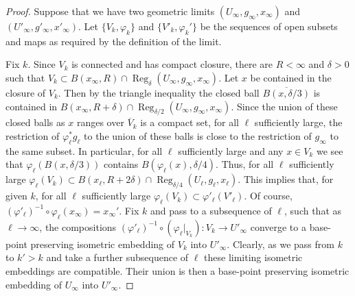 \begin{proof}
\sketch
{}
Suppose that we have two geometric limits
$(U_\infty,g_\infty,x_\infty)$ and
$(U'_\infty,g'_\infty,x'_\infty)$. Let $\{V_k,\varphi_k\}$ and
$\{V'_k,\varphi_k'\}$ be the sequences of open subsets and maps as
required by the definition of the limit.

Fix $k$. Since $V_k$ is connected and has compact closure, there are
$R<\infty$ and $\delta>0$ such that $V_k\subset B(x_\infty,R)\cap
\operatorname{Reg}_\delta(U_\infty,g_\infty,x_\infty)$. Let $x$ be contained
in the closure of $V_k$. Then by the triangle inequality the closed
ball $\overline{B(x,\delta/3)}$ is contained in
$B(x_\infty,R+\delta)\cap\operatorname{Reg}_{\delta/2}(U_\infty,g_\infty,x_\infty)$. Since the union of
these closed balls as $x$ ranges over $\overline V_k$ is a compact
set, for all $\ell$ sufficiently large, the restriction of
$\varphi_\ell^*g_\ell$ to the union of these balls is close to the
restriction of $g_\infty$ to the same subset. In particular, for all
$\ell$ sufficiently large and any $x\in V_k$ we see that
$\varphi_\ell\left(B(x,\delta/3)\right)$ contains
$B(\varphi_\ell(x),\delta/4)$. Thus, for all $\ell$ sufficiently
large $\varphi_\ell(V_k)\subset B(x_\ell,R+2\delta)\cap \operatorname{Reg}_{\delta/4}(U_\ell,g_\ell,x_\ell)$. This implies that, for given
$k$, for all $\ell$ sufficiently large $\varphi_\ell(V_k)\subset
\varphi'_\ell(V'_\ell)$. Of course, $(\varphi'_\ell)^{-1}\circ
\varphi_\ell(x_\infty)=x_\infty'$. Fix $k$ and pass to a subsequence
of $\ell$, such that as $\ell\rightarrow\infty$, the compositions
$(\varphi'_\ell)^{-1}\circ\left(\varphi_\ell|_{V_k}\right)\colon
V_k\to U'_\infty$ converge to a base-point preserving isometric
embedding of $V_k$ into $U'_\infty$. Clearly, as we pass from $k$ to
$k'>k$ and take a further subsequence of $\ell$ these limiting
isometric embeddings are compatible. Their union is then a
base-point preserving isometric embedding of $U_\infty$ into
$U'_\infty$.


\end{proof}
